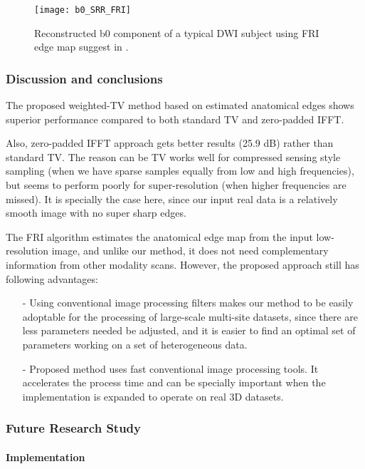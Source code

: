 \begin{figure}[ht]
\centering
\texttt{[image: b0\_SRR\_FRI]}\
\centering
\caption{Reconstructed b0 component of a typical DWI subject using FRI edge map suggest in \cite{ongie2015}.}
\label{b0_SRR_FRI}
\end{figure}

\subsubsection{Discussion and conclusions}
The proposed weighted-TV method based on estimated anatomical edges shows superior performance compared to both standard TV and zero-padded IFFT.
 
Also, zero-padded IFFT approach gets better results (25.9 dB) rather than standard TV. The reason can be TV works well for compressed sensing style sampling (when we have sparse samples equally from low and high frequencies), but seems to perform poorly for super-resolution (when higher frequencies are missed). It is specially the case here, since our input real data is a relatively smooth image with no super sharp edges.

The FRI algorithm estimates the anatomical edge map from the input low-resolution image, and unlike our method, it does not need complementary information from other modality scans. However, the proposed approach still has following advantages:
\begin{itemize}
\item[-] Using conventional image processing filters makes our method to be easily adoptable for the processing of large-scale multi-site datasets, since there are less parameters needed be adjusted, and it is easier to find an optimal set of parameters working on a set of heterogeneous data.
\item[-] Proposed method uses fast conventional image processing tools. It accelerates the process time and can be specially important when the implementation is expanded to operate on real 3D datasets.
\end{itemize}


\subsubsection{Future Research Study}

\paragraph{Implementation}

